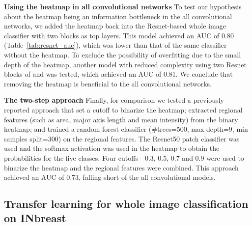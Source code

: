 \documentclass[12pt,letterpaper]{article}
\begin{document}
\textbf{Using the heatmap in all convolutional networks}
\label{heatmap_auc}
To test our hypothesis about the heatmap being an information bottleneck in the all convolutional networks, we added the heatmap back into the Resnet-based whole image classifier with two  blocks as top layers. This model achieved an AUC of 0.80 (Table~\ref{tab:resnet_auc}), which was lower than that of the same classifier without the heatmap. To exclude the possibility of overfitting due to the small depth of the heatmap, another model with reduced complexity using two Resnet blocks of  and  was tested, which achieved an AUC of 0.81. We conclude that removing the heatmap is beneficial to the all convolutional networks.

\textbf{The two-step approach}
\label{two_step_auc}
Finally, for comparison we tested a previously reported approach \cite{shen_breast_2017,wang_deep_2016} that set a cutoff to binarize the heatmap; extracted regional features (such as area, major axis length and mean intensity) from the binary heatmap; and trained a random forest classifier (\#trees=500, max depth=9, min samples split=300) on the regional features. The Resnet50 patch classifier was used and the softmax activation was used in the heatmap to obtain the probabilities for the five classes. Four cutoffs---0.3, 0.5, 0.7 and 0.9 were used to binarize the heatmap and the regional features were combined. This approach achieved an AUC of 0.73, falling short of the all convolutional models.

\subsection{Transfer learning for whole image classification on INbreast}
\label{inbreast}
\end{document}
